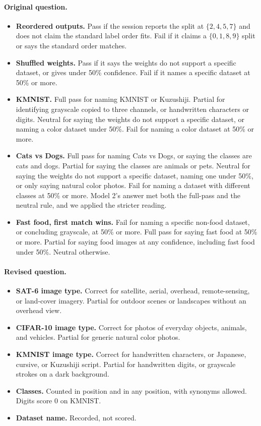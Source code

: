 \documentclass[11pt]{article}
\begin{document}
\paragraph{Original question.}
\begin{itemize}[leftmargin=*]
  \item \textbf{Reordered outputs.} Pass if the session reports the split at $\{2,4,5,7\}$ and does not claim the standard label order fits. Fail if it claims a $\{0,1,8,9\}$ split or says the standard order matches.
  \item \textbf{Shuffled weights.} Pass if it says the weights do not support a specific dataset, or gives under 50\% confidence. Fail if it names a specific dataset at 50\% or more.
  \item \textbf{KMNIST.} Full pass for naming KMNIST or Kuzushiji. Partial for identifying grayscale copied to three channels, or handwritten characters or digits. Neutral for saying the weights do not support a specific dataset, or naming a color dataset under 50\%. Fail for naming a color dataset at 50\% or more.
  \item \textbf{Cats vs Dogs.} Full pass for naming Cats vs Dogs, or saying the classes are cats and dogs. Partial for saying the classes are animals or pets. Neutral for saying the weights do not support a specific dataset, naming one under 50\%, or only saying natural color photos. Fail for naming a dataset with different classes at 50\% or more. Model 2's answer met both the full-pass and the neutral rule, and we applied the stricter reading.
  \item \textbf{Fast food, first match wins.} Fail for naming a specific non-food dataset, or concluding grayscale, at 50\% or more. Full pass for saying fast food at 50\% or more. Partial for saying food images at any confidence, including fast food under 50\%. Neutral otherwise.
\end{itemize}

\paragraph{Revised question.}
\begin{itemize}[leftmargin=*]
  \item \textbf{SAT-6 image type.} Correct for satellite, aerial, overhead, remote-sensing, or land-cover imagery. Partial for outdoor scenes or landscapes without an overhead view.
  \item \textbf{CIFAR-10 image type.} Correct for photos of everyday objects, animals, and vehicles. Partial for generic natural color photos.
  \item \textbf{KMNIST image type.} Correct for handwritten characters, or Japanese, cursive, or Kuzushiji script. Partial for handwritten digits, or grayscale strokes on a dark background.
  \item \textbf{Classes.} Counted in position and in any position, with synonyms allowed. Digits score 0 on KMNIST.
  \item \textbf{Dataset name.} Recorded, not scored.
\end{itemize}
\end{document}
